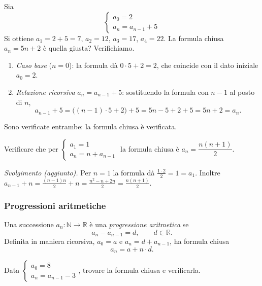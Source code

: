 \documentclass[11pt,a4paper]{article}
\begin{document}
\begin{esempio}
Sia
\[
  \begin{cases}
    a_0 = 2\\
    a_n = a_{n-1} + 5
  \end{cases}
\]
Si ottiene $a_1 = 2 + 5 = 7$, $a_2 = 12$, $a_3 = 17$, $a_4 = 22$. La formula
chiusa $a_n = 5n + 2$ è quella giusta? Verifichiamo.
\begin{enumerate}
    \item \emph{Caso base} ($n = 0$): la formula dà $0 \cdot 5 + 2 = 2$, che
          coincide con il dato iniziale $a_0 = 2$.
    \item \emph{Relazione ricorsiva} $a_n = a_{n-1} + 5$: sostituendo la
          formula con $n-1$ al posto di $n$,
          \[
            a_{n-1} + 5 = \bigl( (n-1) \cdot 5 + 2 \bigr) + 5
            = 5n - 5 + 2 + 5 = 5n + 2 = a_n .
          \]
\end{enumerate}
Sono verificate entrambe: la formula chiusa è verificata.
\end{esempio}

\begin{esercizio}
Verificare che per
$\begin{cases} a_1 = 1\\ a_n = n + a_{n-1} \end{cases}$
la formula chiusa è $a_n = \dfrac{n(n+1)}{2}$.
\end{esercizio}

\emph{Svolgimento (aggiunto).} Per $n = 1$ la formula dà $\frac{1 \cdot 2}{2} = 1 = a_1$.
Inoltre
$a_{n-1} + n = \frac{(n-1)n}{2} + n = \frac{n^2 - n + 2n}{2} = \frac{n(n+1)}{2}$.

\subsubsection{Progressioni aritmetiche}

\begin{definizione}
Una successione $a_n \colon \mathbb{N} \to \mathbb{R}$ è una
\emph{progressione aritmetica} se
\[
  a_n - a_{n-1} = d, \qquad d \in \mathbb{R}.
\]
Definita in maniera ricorsiva, $a_0 = a$ e $a_n = d + a_{n-1}$, ha formula
chiusa
\[
  a_n = a + n \cdot d .
\]
\end{definizione}

\begin{esercizio}
Data $\begin{cases} a_0 = 8\\ a_n = a_{n-1} - 3 \end{cases}$, trovare la formula
chiusa e verificarla.
\end{esercizio}
\end{document}
